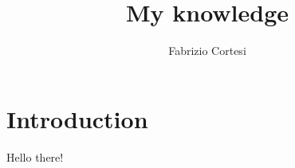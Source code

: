 \documentclass{article}
\title{My knowledge}
\author{Fabrizio Cortesi}
\begin{document}
\maketitle

\section*{Introduction}

Hello there!

\tableofcontents










\end{document}

